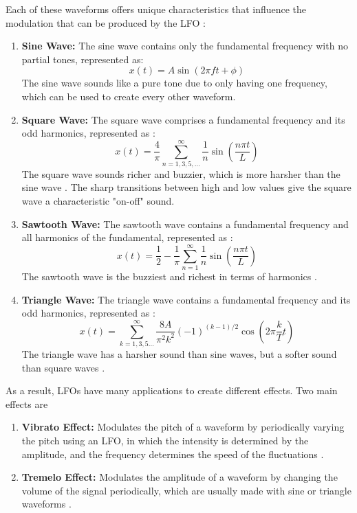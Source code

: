 \documentclass[12pt]{article}
\begin{document}
Each of these waveforms offers unique characteristics that influence the modulation that can be produced by the LFO \cite{SSTS}:
\begin{enumerate}
    \item \textbf{Sine Wave:} The sine wave contains only the fundamental frequency with no partial tones, represented as:
    \begin{equation}
        x(t) = A \sin(2\pi f t + \phi)
    \end{equation}
    The sine wave sounds like a pure tone due to only having one frequency, which can be used to create every other waveform. 

    \item \textbf{Square Wave:} The square wave comprises a fundamental frequency and its odd harmonics, represented as \cite{SW}:
    \begin{equation}
        x(t) = \frac{4}{\pi} \sum_{n=1,3,5,\ldots}^\infty \frac{1}{n} \sin\left(\frac{n \pi t}{L}\right)
    \end{equation}
    The square wave sounds richer and buzzier, which is more harsher than the sine wave \cite{SSTS, OTTO}. The sharp transitions between high and low values give the square wave a characteristic "on-off" sound.

    \item \textbf{Sawtooth Wave:} The sawtooth wave contains a fundamental frequency and all harmonics of the fundamental, represented as \cite{STW}:
    \begin{equation}
        x(t) = \frac{1}{2} - \frac{1}{\pi} \sum_{n=1}^\infty \frac{1}{n} \sin\left(\frac{n \pi t}{L}\right)
    \end{equation}
    The sawtooth wave is the buzziest and richest in terms of harmonics \cite{OTTO}.

    \item \textbf{Triangle Wave:} The triangle wave contains a fundamental frequency and its odd harmonics, represented as \cite{TW}:
    \begin{equation}
            x(t) = \sum_{k=1,3,5\ldots}^{\infty} \frac{8A}{\pi^2 k^2} (-1)^{(k-1)/2} \cos\left( 2 \pi \frac{k}{T} t \right)
    \end{equation}
    The triangle wave has a harsher sound than sine waves, but a softer sound than square waves \cite{OTTO}.
\end{enumerate}
As a result, LFOs have many applications to create different effects. Two main effects are
\begin{enumerate} 
    \item \textbf{Vibrato Effect:} Modulates the pitch of a waveform by periodically varying the pitch using an LFO, in which the intensity is determined by the amplitude, and the frequency determines the speed of the fluctuations \cite{CC}.

    \item \textbf{Tremelo Effect:} Modulates the amplitude of a waveform by changing the volume of the signal periodically, which are usually made with sine or triangle waveforms \cite{CC1}.
\end{enumerate}
\end{document}
